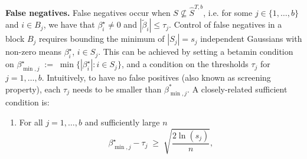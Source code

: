 \documentclass[aos]{imsart}
\theoremstyle{plain}
\begin{document}
\noindent\textbf{False negatives.} 
False negatives occur when $S\not\subseteq \hat S^{T,b}$, i.e. for some $j \in \{1,\ldots,b\}$ and $i\in B_j$,  we have that $\beta^\star_i\neq 0$ and $|\tilde\beta_i|\leq \tau_j$. %
Control of false negatives in a block $B_j$ requires bounding the minimum of $|S_j|=s_j$ independent Gaussians with non-zero means $\beta^{\star}_i$, $i\in S_j$. This can be achieved by setting a betamin condition %
on $\beta_{\min,j}^{\star}\;:=\;\min\{|\beta^\star_i|: i\in S_j\}$,
and a condition on the thresholds $\tau_j$ for $j=1,\ldots,b$.  
Intuitively, to have no false positives (also known as screening property), each $\tau_j$ needs to be smaller than $\beta^*_{\min,j}$.
A closely-related sufficient condition is: 
\begin{enumerate}[start=5,label={(A\arabic*)}]
    \item For all $j=1,\ldots,b$ and sufficiently large $n$
\begin{equation*}\label{cond:suffIIallblockthresh}
	 \beta_{\min,j}^{\star} - \tau_j \;\geq\; \sqrt{\frac{2\ln(s_j)}{n}},
\end{equation*}
\end{enumerate}
\end{document}
